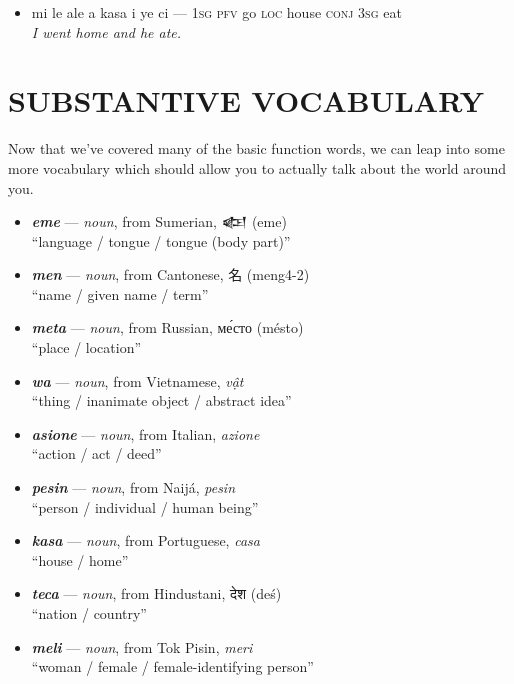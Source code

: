 \documentclass[a4paper, titlepage]{article}
\begin{document}
\begin{itemize}
	\begin{itemize}
		\item mi le ale a kasa i ye ci — \textsc{1sg pfv} go \textsc{loc} house \textsc{conj 3sg} eat \\\textit{I went home and he ate.}
	\end{itemize}
\end{itemize}

\section{SUBSTANTIVE VOCABULARY}

Now that we've covered many of the basic function words, we can leap into some more vocabulary which should allow you to actually talk about the world around you.

\begin{itemize}
	\item \textbf{\textit{eme}} — \textit{noun}, from Sumerian, {\cuneiffont 𒅴} (eme) \\``language / tongue / tongue (body part)''
	\item \textbf{\textit{men}} — \textit{noun}, from Cantonese, 名 (meng4-2) \\``name / given name / term''
	\item \textbf{\textit{meta}} — \textit{noun}, from Russian, ме́сто (mésto) \\``place / location''
	\item \textbf{\textit{wa}} — \textit{noun}, from Vietnamese, \textit{vật} \\``thing / inanimate object / abstract idea''
	\item \textbf{\textit{asione}} — \textit{noun}, from Italian, \textit{azione} \\``action / act / deed''
	\item \textbf{\textit{pesin}} — \textit{noun}, from Naijá, \textit{pesin} \\``person / individual / human being''
	\item \textbf{\textit{kasa}} — \textit{noun}, from Portuguese, \textit{casa} \\``house / home''
	\item \textbf{\textit{teca}} — \textit{noun}, from Hindustani, {\hmfont देश} (deś) \\``nation / country''
	\item \textbf{\textit{meli}} — \textit{noun}, from Tok Pisin, \textit{meri} \\``woman / female / female-identifying person''

\end{itemize}
\end{document}
